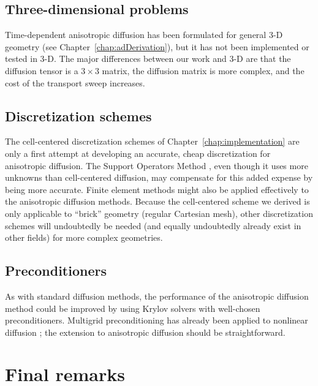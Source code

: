 \subsection{Three-dimensional problems}

Time-dependent anisotropic diffusion has been formulated for general
3-D geometry (see Chapter~\ref{chap:adDerivation}), but it has not
been implemented or tested in 3-D. The major differences between our work
and 3-D are that the
diffusion tensor is a $3\times 3$ matrix, the diffusion matrix is more
complex, and the cost of the transport sweep increases.

\subsection{Discretization schemes}

The cell-centered discretization schemes of Chapter~\ref{chap:implementation}
are only a first attempt at developing an accurate, cheap discretization for
anisotropic diffusion. The Support Operators Method
\cite{Mor1998,Run2006}, even though it uses more unknowns than
cell-centered diffusion, may compensate for this added expense by being more accurate. Finite element
methods might also be applied effectively to the anisotropic diffusion methods.
Because the cell-centered scheme we derived is only applicable to ``brick''
geometry (regular Cartesian mesh), other discretization schemes will undoubtedly
be needed (and equally undoubtedly already exist in other fields) for more
complex geometries.

\subsection{Preconditioners}

As with standard diffusion methods, the performance of the anisotropic diffusion method could be improved
by using Krylov solvers with well-chosen preconditioners. Multigrid
preconditioning has already been applied to nonlinear diffusion
\cite{Rid1999,Mou2006};
the extension to anisotropic diffusion should be straightforward.

\section{Final remarks}

